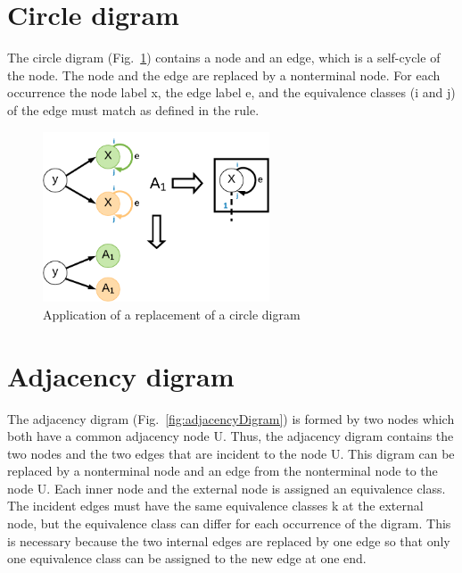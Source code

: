 \documentclass[a4paper]{scrartcl}
\begin{document}
\section{Circle digram}
\label{sec:circleDigram}



The circle digram (Fig.~\ref{fig:circleDigram}) contains a node and an edge, which is a self-cycle of the node. The node and the edge are replaced by a nonterminal node. For each occurrence the node label x, the edge label e, and the equivalence classes (i and j) of the edge must match as defined in the rule.

\begin{figure}[h]
	\centering
	\includegraphics[width=0.6\textwidth]{img/circleDigram}
	\caption{Application of a replacement of a circle digram}
	\label{fig:circleDigram}
\end{figure}



\section{Adjacency digram}
\label{sec:adjacencyDigram}



The adjacency digram (Fig.~\ref{fig:adjacencyDigram}) is formed by two nodes which both have a common adjacency node U. Thus, the adjacency digram contains the two nodes and the two edges that are incident to the node U. This digram can be replaced by a nonterminal node and an edge from the nonterminal node to the node U. Each inner node and the external node is assigned an equivalence class.
The incident edges must have the same equivalence classes k at the external node, but the equivalence class can differ for each occurrence of the digram. This is necessary because the two internal edges are replaced by one edge so that only one equivalence class can be assigned to the new edge at one end.
\end{document}
